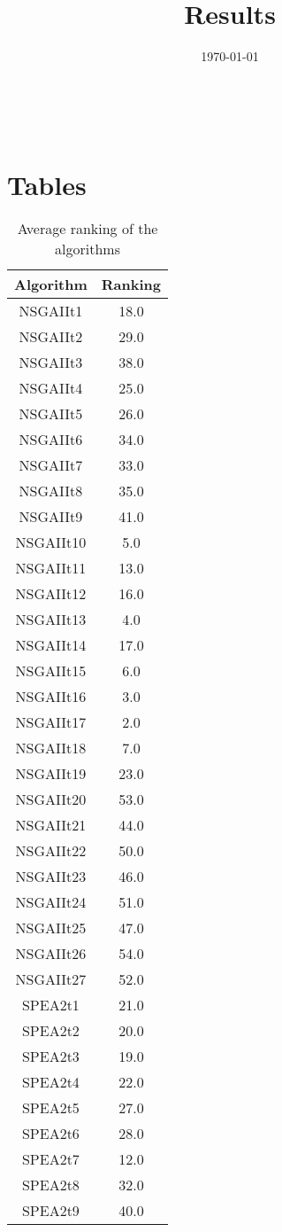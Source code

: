 \documentclass{article}
\title{Results}
\author{}
\date{\today}
\begin{document}
\oddsidemargin 0in \topmargin 0in\maketitle
\
\section{Tables}
\begin{table}[!htp]
\centering
\caption{Average ranking of the algorithms}
\begin{tabular}{c|c}
Algorithm&Ranking\\
\hline
NSGAIIt1&18.0\\
NSGAIIt2&29.0\\
NSGAIIt3&38.0\\
NSGAIIt4&25.0\\
NSGAIIt5&26.0\\
NSGAIIt6&34.0\\
NSGAIIt7&33.0\\
NSGAIIt8&35.0\\
NSGAIIt9&41.0\\
NSGAIIt10&5.0\\
NSGAIIt11&13.0\\
NSGAIIt12&16.0\\
NSGAIIt13&4.0\\
NSGAIIt14&17.0\\
NSGAIIt15&6.0\\
NSGAIIt16&3.0\\
NSGAIIt17&2.0\\
NSGAIIt18&7.0\\
NSGAIIt19&23.0\\
NSGAIIt20&53.0\\
NSGAIIt21&44.0\\
NSGAIIt22&50.0\\
NSGAIIt23&46.0\\
NSGAIIt24&51.0\\
NSGAIIt25&47.0\\
NSGAIIt26&54.0\\
NSGAIIt27&52.0\\
SPEA2t1&21.0\\
SPEA2t2&20.0\\
SPEA2t3&19.0\\
SPEA2t4&22.0\\
SPEA2t5&27.0\\
SPEA2t6&28.0\\
SPEA2t7&12.0\\
SPEA2t8&32.0\\
SPEA2t9&40.0\\

\end{tabular}
\end{table}
\end{document}
